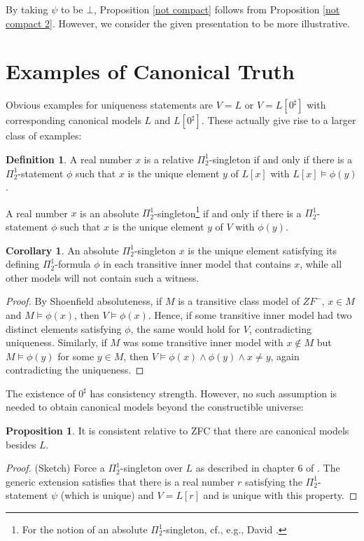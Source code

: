 \documentclass[a4paper,12pt]{amsart}
\theoremstyle{definition}
\newtheorem{prop}[fact]{Proposition}
\newtheorem{corollary}[fact]{Corollary}
\newtheorem{defini}[fact]{Definition}
\begin{document}
By taking $\psi$ to be $\bot$, Proposition \ref{not compact} follows from Proposition \ref{not compact 2}. However, we consider the given presentation to be more illustrative.

\section{Examples of Canonical Truth}

Obvious examples for uniqueness statements are $V=L$ or $V=L[0^{\sharp}]$ with corresponding canonical models $L$ and $L[0^{\sharp}]$. These actually give rise to a larger class of examples:

\begin{defini}
 A real number $x$ is a relative $\Pi^{1}_{2}$-singleton if and only if there is a $\Pi^{1}_{2}$-statement $\phi$ such that $x$ is the unique element $y$ of $L[x]$ with $L[x]\models\phi(y)$.

A real number $x$ is an absolute $\Pi^{1}_{2}$-singleton\footnote{For the notion of an absolute $\Pi^1_2$-singleton, cf., e.g., David \cite{David}.} if and only if there is a $\Pi^{1}_{2}$-statement $\phi$ such that $x$ is the unique element $y$ of $V$ with $\phi(y)$.
\end{defini}

\begin{corollary}
An absolute $\Pi^{1}_{2}$-singleton $x$ is the unique element satisfying its defining $\Pi^{1}_{2}$-formula $\phi$ in each transitive inner model that contains $x$, while
all other models will not contain such a witness.
\end{corollary}
\begin{proof}
 By Shoenfield absoluteness, if $M$ is a transitive class model of $ZF^{-}$, $x\in M$ and $M\models\phi(x)$, then $V\models\phi(x)$. Hence, if some transitive inner model had two distinct elements
satisfying $\phi$, the same would hold for $V$, contradicting uniqueness. Similarly, if $M$ was some transitive inner model with $x\notin M$ but $M\models\phi(y)$ for some $y\in M$,
then $V\models\phi(x)\wedge\phi(y)\wedge x\neq y$, again contradicting the uniqueness.
\end{proof}

The existence of $0^{\sharp}$ has consistency strength. However, no such assumption is needed to obtain canonical models beyond the constructible universe:

\begin{prop}
It is consistent relative to ZFC that there are canonical models besides $L$.
\end{prop}
\begin{proof} (Sketch)
 Force a $\Pi^{1}_{2}$-singleton over $L$ as described in chapter $6$ of \cite{Fr}. The generic extension satisfies that there is a real number $r$
satisfying the $\Pi^{1}_{2}$-statement $\psi$ (which is unique) and $V=L[r]$ and is unique with this property.
\end{proof}
\end{document}
